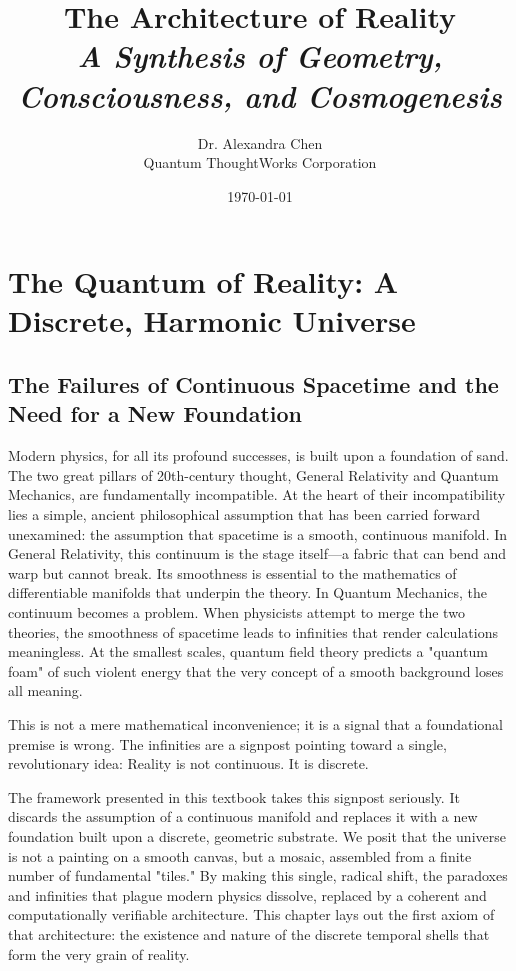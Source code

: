 \documentclass[12pt]{report}
\title{
    \Huge \textbf{The Architecture of Reality} \\
    \large \textit{A Synthesis of Geometry, Consciousness, and Cosmogenesis}
}
\author{\large Dr. Alexandra Chen \\ \small Quantum ThoughtWorks Corporation}
\date{\today}
\begin{document}
\maketitle
\tableofcontents
\newpage

\chapter{The Quantum of Reality: A Discrete, Harmonic Universe}

\section{The Failures of Continuous Spacetime and the Need for a New Foundation}
Modern physics, for all its profound successes, is built upon a foundation of sand. The two great pillars of 20th-century thought, General Relativity and Quantum Mechanics, are fundamentally incompatible. At the heart of their incompatibility lies a simple, ancient philosophical assumption that has been carried forward unexamined: the assumption that spacetime is a smooth, continuous manifold.
In General Relativity, this continuum is the stage itself—a fabric that can bend and warp but cannot break. Its smoothness is essential to the mathematics of differentiable manifolds that underpin the theory. In Quantum Mechanics, the continuum becomes a problem. When physicists attempt to merge the two theories, the smoothness of spacetime leads to infinities that render calculations meaningless. At the smallest scales, quantum field theory predicts a "quantum foam" of such violent energy that the very concept of a smooth background loses all meaning.

This is not a mere mathematical inconvenience; it is a signal that a foundational premise is wrong. The infinities are a signpost pointing toward a single, revolutionary idea: Reality is not continuous. It is discrete.

The framework presented in this textbook takes this signpost seriously. It discards the assumption of a continuous manifold and replaces it with a new foundation built upon a discrete, geometric substrate. We posit that the universe is not a painting on a smooth canvas, but a mosaic, assembled from a finite number of fundamental "tiles." By making this single, radical shift, the paradoxes and infinities that plague modern physics dissolve, replaced by a coherent and computationally verifiable architecture. This chapter lays out the first axiom of that architecture: the existence and nature of the discrete temporal shells that form the very grain of reality.
\end{document}
